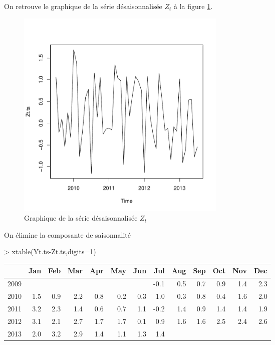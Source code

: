 \begin{solution}{1.1}
\begin{enumerate}
On retrouve le graphique de la série désaisonnalisée $Z_t$ à la figure \ref{fig:exercice1-graph2}.
\begin{figure}[!ht]
\centering
\includegraphics[height=4in, width=4in]{exercice1-graph2.pdf}
\caption{Graphique de la série désaisonnalisée $Z_t$}
\label{fig:exercice1-graph2}
\end{figure}

On élimine la composante de saisonnalité
\begin{Schunk}
\begin{Sinput}
> xtable(Yt.ts-Zt.ts,digits=1)
\end{Sinput}
\begin{table}[ht]
\centering
\begin{tabular}{rrrrrrrrrrrrr}
  \hline
 & Jan & Feb & Mar & Apr & May & Jun & Jul & Aug & Sep & Oct & Nov & Dec \\
  \hline
2009 &  &  &  &  &  &  & -0.1 & 0.5 & 0.7 & 0.9 & 1.4 & 2.3 \\
  2010 & 1.5 & 0.9 & 2.2 & 0.8 & 0.2 & 0.3 & 1.0 & 0.3 & 0.8 & 0.4 & 1.6 & 2.0 \\
  2011 & 3.2 & 2.3 & 1.4 & 0.6 & 0.7 & 1.1 & -0.2 & 1.4 & 0.9 & 1.4 & 1.4 & 1.9 \\
  2012 & 3.1 & 2.1 & 2.7 & 1.7 & 1.7 & 0.1 & 0.9 & 1.6 & 1.6 & 2.5 & 2.4 & 2.6 \\
  2013 & 2.0 & 3.2 & 2.9 & 1.4 & 1.1 & 1.3 & 1.4 &  &  &  &  &  \\
   \hline
\end{tabular}
\end{table}\end{Schunk}


\end{enumerate}
\end{solution}
